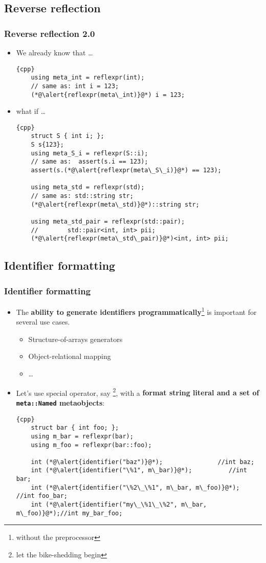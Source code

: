 \documentclass[compress,table,xcolor=table]{beamer}
\begin{document}
\subsection{Reverse reflection}
\begin{frame}[fragile]
\frametitle{Reverse reflection 2.0}
    \begin{itemize}
      \item We already know that \ldots
      \begin{lstlisting}{cpp}
	using meta_int = reflexpr(int);
	// same as: int i = 123;
	(*@\alert{reflexpr(meta\_int)}@*) i = 123;
      \end{lstlisting}
      \item {\Large what if \dots}
      \begin{lstlisting}{cpp}
	struct S { int i; };
	S s{123};
	using meta_S_i = reflexpr(S::i);
	// same as:  assert(s.i == 123);
	assert(s.(*@\alert{reflexpr(meta\_S\_i)}@*) == 123);

	using meta_std = reflexpr(std);
	// same as: std::string str;
	(*@\alert{reflexpr(meta\_std)}@*)::string str;

	using meta_std_pair = reflexpr(std::pair); 
	//        std::pair<int, int> pii;
	(*@\alert{reflexpr(meta\_std\_pair)}@*)<int, int> pii;
      \end{lstlisting}
    \end{itemize}
\end{frame}

\subsection{Identifier formatting}
\begin{frame}[fragile]
\frametitle{Identifier formatting}
  \begin{itemize}
    \item {\large The \textbf{ability to generate identifiers programmatically}\footnote{
       without the preprocessor} is important for several use cases.}
    \begin{itemize}
      \footnotesize
      \item Structure-of-arrays generators
      \item Object-relational mapping
      \item \ldots
    \end{itemize}
    \item Let's use special operator, say \verb@identifier@\footnote{let the
      bike-shedding begin}, with a \textbf{format string literal
      and a set of \texttt{meta::Named} metaobjects}:
      \begin{lstlisting}{cpp}
	struct bar { int foo; };
	using m_bar = reflexpr(bar);
	using m_foo = reflexpr(bar::foo);

	int (*@\alert{identifier("baz")}@*);               //int baz;
	int (*@\alert{identifier("\%1", m\_bar)}@*);          //int bar;
	int (*@\alert{identifier("\%2\_\%1", m\_bar, m\_foo)}@*);  //int foo_bar;
	int (*@\alert{identifier("my\_\%1\_\%2", m\_bar, m\_foo)}@*);//int my_bar_foo;
      \end{lstlisting}
  \end{itemize}
\end{frame}
\end{document}
